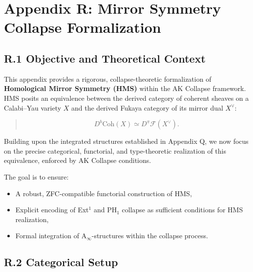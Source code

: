 \documentclass[11pt]{article}
\begin{document}

\section*{Appendix R: Mirror Symmetry Collapse Formalization}

\subsection*{R.1 Objective and Theoretical Context}

This appendix provides a rigorous, collapse-theoretic formalization of \textbf{Homological Mirror Symmetry (HMS)} within the AK Collapse framework. HMS posits an equivalence between the derived category of coherent sheaves on a Calabi–Yau variety \( X \) and the derived Fukaya category of its mirror dual \( X^\vee \):

\begin{quote}
\[
D^b\mathrm{Coh}(X) \simeq D^\pi\mathcal{F}(X^\vee).
\]
\end{quote}


Building upon the integrated structures established in Appendix Q, we now focus on the precise categorical, functorial, and type-theoretic realization of this equivalence, enforced by AK Collapse conditions.

The goal is to ensure:
\begin{itemize}
  \item A robust, ZFC-compatible functorial construction of HMS,
  \item Explicit encoding of Ext$^1$ and PH$_1$ collapse as sufficient conditions for HMS realization,
  \item Formal integration of A$_\infty$-structures within the collapse process.
\end{itemize}


\subsection*{R.2 Categorical Setup}
\end{document}
